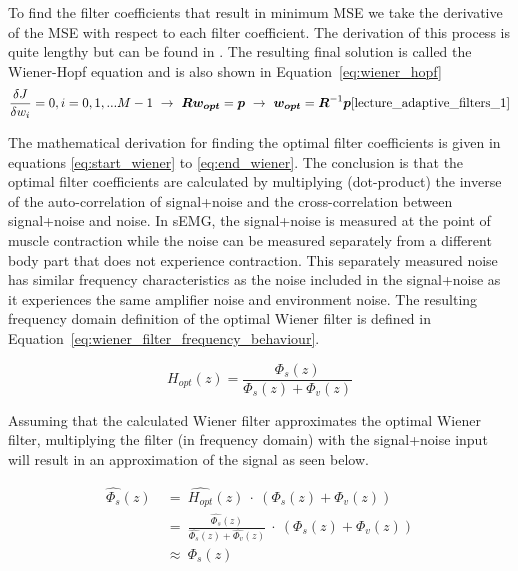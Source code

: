 To find the filter coefficients that result in minimum MSE we take the derivative of the MSE with respect to each filter coefficient. The derivation of this process is quite lengthy but can be found in \cite{proakis_manolakis_1996}. The resulting final solution is called the Wiener-Hopf equation \cite{lecture_adaptive_filters_1} and is also shown in Equation~\ref{eq:wiener_hopf}
\begin{equation}\label{eq:end_wiener}
    \frac{\delta J}{\delta w_i} = 0, i = 0, 1, ... M-1 \ \rightarrow \ \boldsymbol{R} \boldsymbol{w_{opt}} = \boldsymbol{p} \ \rightarrow \ \boldsymbol{w_{opt}} = \boldsymbol{R}^{-1}\boldsymbol{p} \text{\cite{lecture_adaptive_filters_1}}
\end{equation}


The mathematical derivation for finding the optimal filter coefficients is given in equations \ref{eq:start_wiener} to \ref{eq:end_wiener}. The conclusion is that the optimal filter coefficients are calculated by multiplying (dot-product) the inverse of the auto-correlation of signal+noise and the cross-correlation between signal+noise and noise. In sEMG, the signal+noise is measured at the point of muscle contraction while the noise can be measured separately from a different body part that does not experience contraction. This separately measured noise has similar frequency characteristics as the noise included in the signal+noise as it experiences the same amplifier noise and environment noise. The resulting frequency domain definition of the optimal Wiener filter is defined in Equation~\ref{eq:wiener_filter_frequency_behaviour}\cite{stanford_wiener_filter}.

\begin{equation}
    H_{opt}(z) = \frac{\Phi_{s}(z)}{\Phi_{s}(z) + \Phi_{v}(z)}
    \label{eq:wiener_filter_frequency_behaviour}
\end{equation}

Assuming that the calculated Wiener filter approximates the optimal Wiener filter, multiplying the filter (in frequency domain) with the signal+noise input will result in an approximation of the signal as seen below.

\begin{align}
    \hat{\Phi_{s}}(z) & \ = \ \hat{H_{opt}}(z) \ \cdot \ (\Phi_{s}(z) + \Phi_{v}(z)) \label{eq:wiener_filter_frequency_application_1} \\
    & \ = \ \frac{\hat{\Phi_{s}}(z)}{\hat{\Phi_{s}}(z) + \hat{\Phi_{v}}(z)} \ \cdot \ (\Phi_{s}(z) + \Phi_{v}(z)) \label{eq:wiener_filter_frequency_application_2}\\
    & \ \approx \ \Phi_{s}(z) \label{eq:wiener_filter_frequency_application_3}
\end{align}

